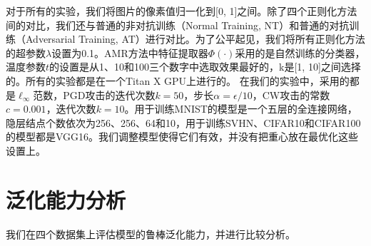 对于所有的实验，我们将图片的像素值归一化到[0, 1]之间。除了四个正则化方法间的对比，我们还与普通的非对抗训练（Normal Training, NT）和普通的对抗训练（Adversarial Training, AT）进行对比。为了公平起见，我们将所有正则化方法的超参数$\lambda$设置为0.1。AMR方法中特征提取器$\varPhi(\cdot)$采用的是自然训练的分类器，温度参数$t$的设置是从1、10和100三个数字中选取效果最好的，k是[1, 10]之间选择的。所有的实验都是在一个Titan X GPU上进行的。
在我们的实验中，采用的都是$\ell_{\infty}$范数，PGD攻击的迭代次数$k=50$，步长$\alpha=\epsilon/10$，CW攻击的常数$c=0.001$，迭代次数$k=10$。用于训练MNIST的模型是一个五层的全连接网络，隐层结点个数依次为256、256、64和10，用于训练SVHN、CIFAR10和CIFAR100的模型都是VGG16\cite{simonyan2014very}。我们调整模型使得它们有效，并没有把重心放在最优化这些设置上。

\section{泛化能力分析} \label{section:generalization}

我们在四个数据集上评估模型的鲁棒泛化能力，并进行比较分析。


